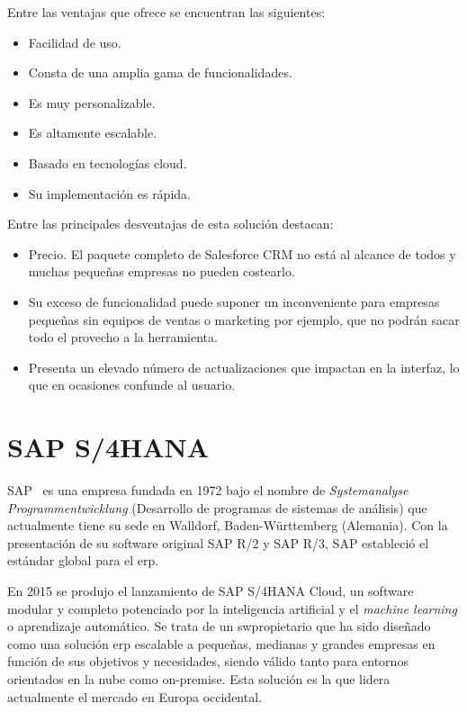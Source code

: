 Entre las ventajas que ofrece se encuentran las siguientes:
\begin{itemize}
\item Facilidad de uso.
\item Consta de una amplia gama de funcionalidades.
\item Es muy personalizable.
\item Es altamente escalable.
\item Basado en tecnologías cloud.
\item Su implementación es rápida.
\end{itemize}

Entre las principales desventajas de esta solución destacan:
\begin{itemize}
\item Precio. El paquete completo de Salesforce CRM no está al alcance de todos y muchas pequeñas empresas no pueden costearlo.
\item Su exceso de funcionalidad puede suponer un inconveniente para empresas pequeñas sin equipos de ventas o marketing por ejemplo, que no podrán sacar todo el provecho a la herramienta.
\item Presenta un elevado número de actualizaciones que impactan en la interfaz, lo que en ocasiones confunde al usuario.
\end{itemize}


\section{SAP S/4HANA}
\label{sec:estado-arte-sap}

SAP~\citep{SAP} es una empresa fundada en 1972 bajo el nombre de \textit{Systemanalyse Programmentwicklung} (Desarrollo de programas de sistemas de análisis) que actualmente tiene su sede en Walldorf, Baden-Württemberg (Alemania). Con la presentación de su software original SAP R/2 y SAP R/3, SAP estableció el estándar global para el \acrlong{erp}.

En 2015 se produjo el lanzamiento de SAP S/4HANA Cloud, un software modular y completo potenciado por la inteligencia artificial y el \textit{machine learning} o aprendizaje automático. Se trata de un \gls{swpropietario} que ha sido diseñado como una solución \acrshort{erp} escalable a pequeñas, medianas y grandes empresas en función de sus objetivos y necesidades, siendo válido tanto para entornos orientados en la nube como on-premise. Esta solución es la que lidera actualmente el mercado en Europa occidental. \newline

